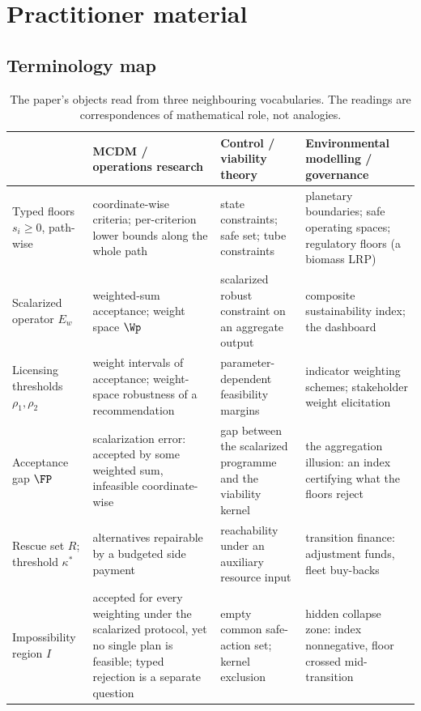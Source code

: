 \section{Practitioner material}\label{si:practice}

\subsection{Terminology map}

\begin{table}[!htbp]
\centering\small
\caption{The paper's objects read from three neighbouring vocabularies. The readings are correspondences of mathematical role, not analogies.}
\label{tab:translation}
\begin{tabularx}{\textwidth}{@{}>{\raggedright\arraybackslash}p{}>{\raggedright\arraybackslash}X>{\raggedright\arraybackslash}X>{\raggedright\arraybackslash}X@{}}
\toprule
 & MCDM / operations research & Control / viability theory & Environmental modelling / governance \\
\midrule
Typed floors $s_i\ge0$, path-wise & coordinate-wise criteria; per-criterion lower bounds along the whole path & state constraints; safe set; tube constraints & planetary boundaries; safe operating spaces; regulatory floors (a biomass LRP) \\
\addlinespace
Scalarized operator $E_w$ & weighted-sum acceptance; weight space $\Wp$ & scalarized robust constraint on an aggregate output & composite sustainability index; the dashboard \\
\addlinespace
Licensing thresholds $\rho_1,\rho_2$ & weight intervals of acceptance; weight-space robustness of a recommendation & parameter-dependent feasibility margins & indicator weighting schemes; stakeholder weight elicitation \\
\addlinespace
Acceptance gap $\FP$ & scalarization error: accepted by some weighted sum, infeasible coordinate-wise & gap between the scalarized programme and the viability kernel & the aggregation illusion: an index certifying what the floors reject \\
\addlinespace
Rescue set $R$; threshold $\kappa^*$ & alternatives repairable by a budgeted side payment & reachability under an auxiliary resource input & transition finance: adjustment funds, fleet buy-backs \\
\addlinespace
Impossibility region $I$ & accepted for every weighting under the scalarized protocol, yet no single plan is feasible; typed rejection is a separate question & empty common safe-action set; kernel exclusion & hidden collapse zone: index nonnegative, floor crossed mid-transition \\

\end{tabularx}
\end{table}
